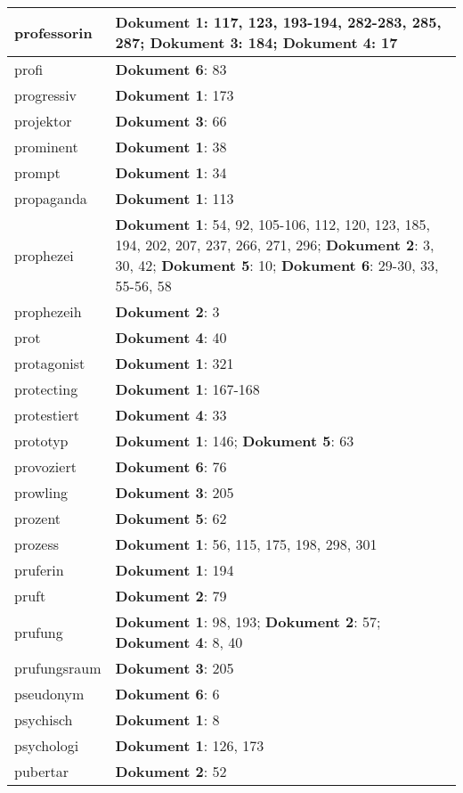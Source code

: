 \documentclass[a5paper]{article}
\begin{document}
\begin{longtable}[l]{|l|p{3in}|}
\hline
professorin & \textbf{Dokument 1}: 117, 123, 193-194, 282-283, 285, 287; \textbf{Dokument 3}: 184; \textbf{Dokument 4}: 17 \\
\hline
profi & \textbf{Dokument 6}: 83 \\
\hline
progressiv & \textbf{Dokument 1}: 173 \\
\hline
projektor & \textbf{Dokument 3}: 66 \\
\hline
prominent & \textbf{Dokument 1}: 38 \\
\hline
prompt & \textbf{Dokument 1}: 34 \\
\hline
propaganda & \textbf{Dokument 1}: 113 \\
\hline
prophezei & \textbf{Dokument 1}: 54, 92, 105-106, 112, 120, 123, 185, 194, 202, 207, 237, 266, 271, 296; \textbf{Dokument 2}: 3, 30, 42; \textbf{Dokument 5}: 10; \textbf{Dokument 6}: 29-30, 33, 55-56, 58 \\
\hline
prophezeih & \textbf{Dokument 2}: 3 \\
\hline
prot & \textbf{Dokument 4}: 40 \\
\hline
protagonist & \textbf{Dokument 1}: 321 \\
\hline
protecting & \textbf{Dokument 1}: 167-168 \\
\hline
protestiert & \textbf{Dokument 4}: 33 \\
\hline
prototyp & \textbf{Dokument 1}: 146; \textbf{Dokument 5}: 63 \\
\hline
provoziert & \textbf{Dokument 6}: 76 \\
\hline
prowling & \textbf{Dokument 3}: 205 \\
\hline
prozent & \textbf{Dokument 5}: 62 \\
\hline
prozess & \textbf{Dokument 1}: 56, 115, 175, 198, 298, 301 \\
\hline
pruferin & \textbf{Dokument 1}: 194 \\
\hline
pruft & \textbf{Dokument 2}: 79 \\
\hline
prufung & \textbf{Dokument 1}: 98, 193; \textbf{Dokument 2}: 57; \textbf{Dokument 4}: 8, 40 \\
\hline
prufungsraum & \textbf{Dokument 3}: 205 \\
\hline
pseudonym & \textbf{Dokument 6}: 6 \\
\hline
psychisch & \textbf{Dokument 1}: 8 \\
\hline
psychologi & \textbf{Dokument 1}: 126, 173 \\
\hline
pubertar & \textbf{Dokument 2}: 52 \\

\end{longtable}
\end{document}

